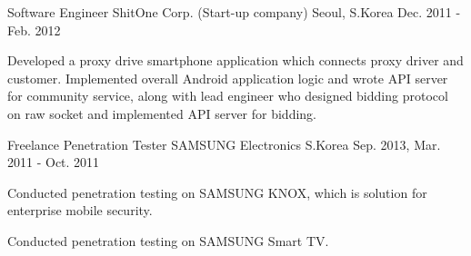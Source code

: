 \begin{cventries}
{\begin{cvitems}
      \end{cvitems}
    }
  \cventry
    {Software Engineer}
    {ShitOne Corp. (Start-up company)}
    {Seoul, S.Korea}
    {Dec. 2011 - Feb. 2012}
    {
      \begin{cvitems}
        \item {Developed a proxy drive smartphone application which connects proxy driver and customer. Implemented overall Android application logic and wrote API server for community service, along with lead engineer who designed bidding protocol on raw socket and implemented API server for bidding.}
      \end{cvitems}
    }
  \cventry
    {Freelance Penetration Tester}
    {SAMSUNG Electronics}
    {S.Korea}
    {Sep. 2013, Mar. 2011 - Oct. 2011}
    {
      \begin{cvitems}
        \item {Conducted penetration testing on SAMSUNG KNOX, which is solution for enterprise mobile security.}
        \item {Conducted penetration testing on SAMSUNG Smart TV.}
      \end{cvitems}
    }
\end{cventries}
